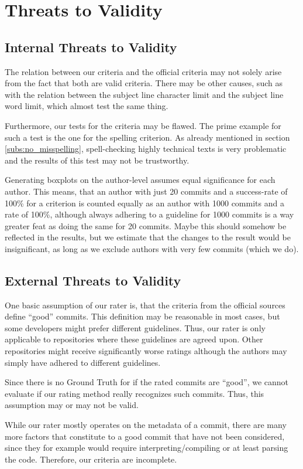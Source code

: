 \section{Threats to Validity}
\label{sec:threats-to-validity}
%


\subsection{Internal Threats to Validity}
\label{sec:internal-threats}

The relation between our criteria and the official criteria may not solely arise from the fact that both are valid criteria. There may be other causes, such as with the relation between the subject line character limit and the subject line word limit, which almost test the same thing.

Furthermore, our tests for the criteria may be flawed. The prime example for such a test is the one for the spelling criterion. As already mentioned in section \ref{subs:no_misspelling}, spell-checking highly technical texts is very problematic and the results of this test may not be trustworthy.

Generating boxplots on the author-level assumes equal significance for each author. This means, that an author with just 20 commits and a success-rate of 100\% for a criterion is counted equally as an author with 1000 commits and a rate of 100\%, although always adhering to a guideline for 1000 commits is a way greater feat as doing the same for 20 commits. Maybe this should somehow be reflected in the results, but we estimate that the changes to the result would be insignificant, as long as we exclude authors with very few commits (which we do).

\subsection{External Threats to Validity}
\label{sec:external-threats}

One basic assumption of our rater is, that the criteria from the official sources define ``good'' commits. This definition may be reasonable in most cases, but some developers might prefer different guidelines. Thus, our rater is only applicable to repositories where these guidelines are agreed upon. Other repositories might receive significantly worse ratings although the authors may simply have adhered to different guidelines.

Since there is no Ground Truth for if the rated commits are ``good'', we cannot evaluate if our rating method really recognizes such commits. Thus, this assumption may or may not be valid.

While our rater mostly operates on the metadata of a commit, there are many more factors that constitute to a good commit that have not been considered, since they for example would require interpreting/compiling or at least parsing the code. Therefore, our criteria are incomplete.
